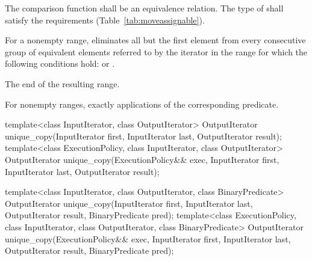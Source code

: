 \begin{itemdescr}
\pnum
\requires
The comparison function shall be an equivalence relation.
The type of  shall satisfy the
 requirements (Table~\ref{tab:moveassignable}).

\pnum
\effects
For a nonempty range, eliminates all but the first element from every
consecutive group of equivalent elements referred to by the iterator
in the range
for which the following conditions hold:
or
.

\pnum
\returns
The end of the resulting range.

\pnum
\complexity
For nonempty ranges, exactly
applications of the corresponding predicate.
\end{itemdescr}

%
\begin{itemdecl}
template<class InputIterator, class OutputIterator>
  OutputIterator
    unique_copy(InputIterator first, InputIterator last,
                OutputIterator result);
template<class ExecutionPolicy, class InputIterator, class OutputIterator>
  OutputIterator
    unique_copy(ExecutionPolicy&& exec,
                InputIterator first, InputIterator last,
                OutputIterator result);

template<class InputIterator, class OutputIterator,
         class BinaryPredicate>
  OutputIterator
    unique_copy(InputIterator first, InputIterator last,
                OutputIterator result, BinaryPredicate pred);
template<class ExecutionPolicy, class InputIterator, class OutputIterator,
         class BinaryPredicate>
  OutputIterator
    unique_copy(ExecutionPolicy&& exec,
                InputIterator first, InputIterator last,
                OutputIterator result, BinaryPredicate pred);
\end{itemdecl}


